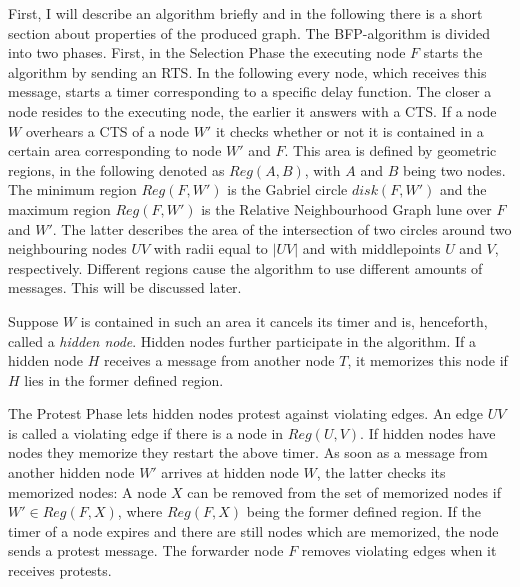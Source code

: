 First, I will describe an algorithm briefly and in the following there is a short section about properties of the produced graph.
The BFP-algorithm is divided into two phases.
First, in the Selection Phase the executing node $F $ starts the algorithm by sending an RTS. 
In the following every node, which receives this message, starts a timer corresponding to a specific delay function.
The closer a node resides to the executing node, the earlier it answers with a CTS. 
If a node $W $ overhears a CTS of a node $W' $ it checks whether or not it is contained in a certain area corresponding to node $W' $ and $F $.
This area is defined by geometric regions, in the following denoted as $Reg(A, B) $, with $A $ and $B $ being two nodes.
The minimum region $Reg(F, W') $ is the Gabriel circle $disk(F, W') $ and the maximum region $Reg(F, W') $ is the Relative Neighbourhood Graph lune over $F $ and $W' $.
The latter describes the area of the intersection of two circles around two neighbouring nodes $UV $ with radii equal to $|UV| $ and with middlepoints $U $ and $V $, respectively.
Different regions cause the algorithm to use different amounts of messages.
This will be discussed later.

Suppose $W $ is contained in such an area it cancels its timer and is, henceforth, called a \emph{hidden node}.
Hidden nodes further participate in the algorithm.
If a hidden node $H $ receives a message from another node $T $, it memorizes this node if $H $ lies in the former defined region. 

The Protest Phase lets hidden nodes protest against violating edges.
An edge $UV $ is called a violating edge if there is a node in $Reg(U, V) $.
If hidden nodes have nodes they memorize they restart the above timer.
As soon as a message from another hidden node $W' $ arrives at hidden node $W $, the latter checks its memorized nodes:
A node $X $ can be removed from the set of memorized nodes if $W' \in Reg(F,X) $, where $Reg(F, X) $ being the former defined region.
If the timer of a node expires and there are still nodes which are memorized, the node sends a protest message.
The forwarder node $F $ removes violating edges when it receives protests.



